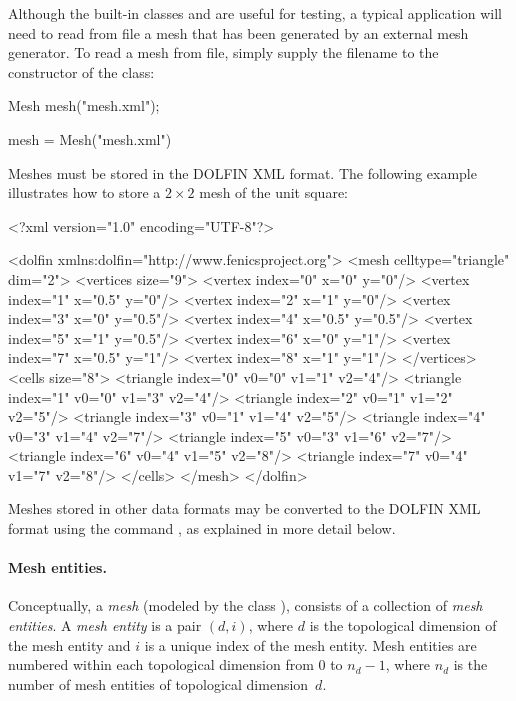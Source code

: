 Although the built-in classes  and 
are useful for testing, a typical application will need to read from
file a mesh that has been generated by an external mesh generator. To read
a mesh from file, simply supply the filename to the constructor of the
 class:
\begin{c++}
Mesh mesh("mesh.xml");
\end{c++}
\begin{python}
mesh = Mesh("mesh.xml")
\end{python}
Meshes must be stored in the DOLFIN XML format. The following example
illustrates how to store a $2 \times 2$ mesh of the unit square:

\begin{xml}
<?xml version="1.0" encoding="UTF-8"?>

<dolfin xmlns:dolfin="http://www.fenicsproject.org">
  <mesh celltype="triangle" dim="2">
    <vertices size="9">
      <vertex index="0" x="0" y="0"/>
      <vertex index="1" x="0.5" y="0"/>
      <vertex index="2" x="1" y="0"/>
      <vertex index="3" x="0" y="0.5"/>
      <vertex index="4" x="0.5" y="0.5"/>
      <vertex index="5" x="1" y="0.5"/>
      <vertex index="6" x="0" y="1"/>
      <vertex index="7" x="0.5" y="1"/>
      <vertex index="8" x="1" y="1"/>
    </vertices>
    <cells size="8">
      <triangle index="0" v0="0" v1="1" v2="4"/>
      <triangle index="1" v0="0" v1="3" v2="4"/>
      <triangle index="2" v0="1" v1="2" v2="5"/>
      <triangle index="3" v0="1" v1="4" v2="5"/>
      <triangle index="4" v0="3" v1="4" v2="7"/>
      <triangle index="5" v0="3" v1="6" v2="7"/>
      <triangle index="6" v0="4" v1="5" v2="8"/>
      <triangle index="7" v0="4" v1="7" v2="8"/>
    </cells>
  </mesh>
</dolfin>
\end{xml}
Meshes stored in other data formats may be converted to the DOLFIN XML
format using the command , as explained in more
detail below.

\paragraph{Mesh entities.}

Conceptually, a \emph{mesh} (modeled by the class ), consists of
a collection of \emph{mesh entities}.  A \emph{mesh entity} is a pair $(d,
i)$, where $d$ is the topological dimension of the mesh entity and $i$
is a unique index of the mesh entity. Mesh entities are numbered within
each topological dimension from $0$ to $n_d-1$, where $n_d$ is the number
of mesh entities of topological dimension~$d$.

